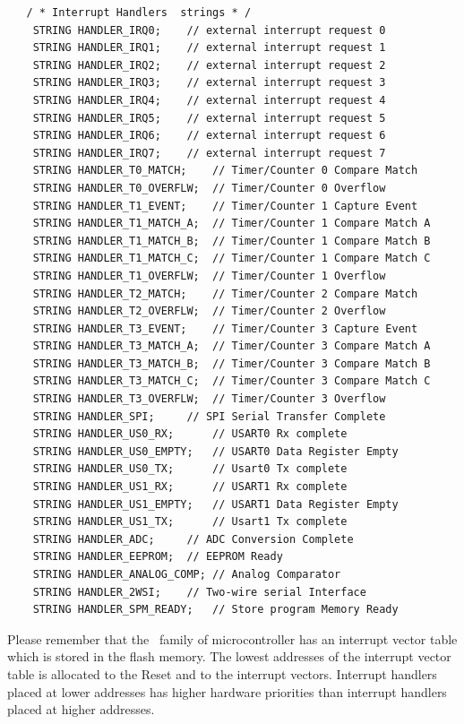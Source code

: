 \begin{lstlisting}
   / * Interrupt Handlers  strings * /
    STRING HANDLER_IRQ0;	// external interrupt request 0
    STRING HANDLER_IRQ1;	// external interrupt request 1
    STRING HANDLER_IRQ2;	// external interrupt request 2
    STRING HANDLER_IRQ3;	// external interrupt request 3
    STRING HANDLER_IRQ4;	// external interrupt request 4
    STRING HANDLER_IRQ5;	// external interrupt request 5
    STRING HANDLER_IRQ6;	// external interrupt request 6
    STRING HANDLER_IRQ7;	// external interrupt request 7
    STRING HANDLER_T0_MATCH;	// Timer/Counter 0 Compare Match
    STRING HANDLER_T0_OVERFLW;	// Timer/Counter 0 Overflow
    STRING HANDLER_T1_EVENT;	// Timer/Counter 1 Capture Event
    STRING HANDLER_T1_MATCH_A;	// Timer/Counter 1 Compare Match A
    STRING HANDLER_T1_MATCH_B;	// Timer/Counter 1 Compare Match B
    STRING HANDLER_T1_MATCH_C;	// Timer/Counter 1 Compare Match C
    STRING HANDLER_T1_OVERFLW;	// Timer/Counter 1 Overflow
    STRING HANDLER_T2_MATCH;	// Timer/Counter 2 Compare Match
    STRING HANDLER_T2_OVERFLW;	// Timer/Counter 2 Overflow
    STRING HANDLER_T3_EVENT;	// Timer/Counter 3 Capture Event
    STRING HANDLER_T3_MATCH_A;	// Timer/Counter 3 Compare Match A
    STRING HANDLER_T3_MATCH_B;	// Timer/Counter 3 Compare Match B
    STRING HANDLER_T3_MATCH_C;	// Timer/Counter 3 Compare Match C
    STRING HANDLER_T3_OVERFLW;	// Timer/Counter 3 Overflow
    STRING HANDLER_SPI; 	// SPI Serial Transfer Complete
    STRING HANDLER_US0_RX;  	// USART0 Rx complete
    STRING HANDLER_US0_EMPTY;	// USART0 Data Register Empty
    STRING HANDLER_US0_TX;  	// Usart0 Tx complete
    STRING HANDLER_US1_RX;  	// USART1 Rx complete
    STRING HANDLER_US1_EMPTY;	// USART1 Data Register Empty
    STRING HANDLER_US1_TX;  	// Usart1 Tx complete
    STRING HANDLER_ADC; 	// ADC Conversion Complete
    STRING HANDLER_EEPROM;	// EEPROM Ready
    STRING HANDLER_ANALOG_COMP;	// Analog Comparator
    STRING HANDLER_2WSI;	// Two-wire serial Interface
    STRING HANDLER_SPM_READY;	// Store program Memory Ready
\end{lstlisting}

Please remember that the \avr\ family of microcontroller has an
interrupt vector table which is stored in the flash memory. The lowest
addresses of the interrupt vector table is allocated to the Reset and
to the interrupt vectors. Interrupt handlers placed at lower addresses
has higher hardware priorities than interrupt handlers placed at
higher addresses.

